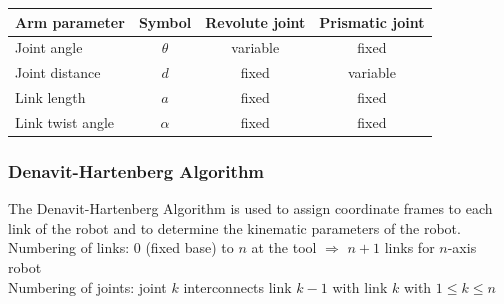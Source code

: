 \documentclass{article}
\begin{document}
	\begin{tabular}{|l|c|c|c|}
		\hline
		\textbf{Arm parameter} & \textbf{Symbol} & \textbf{Revolute joint} & \textbf{Prismatic joint} \\ \hline
		Joint angle            &    $\theta$     &        variable         &          fixed           \\ \hline
		Joint distance         &       $d$       &          fixed          &         variable         \\ \hline
		Link length            &       $a$       &          fixed          &          fixed           \\ \hline
		Link twist angle       &    $\alpha$     &          fixed          &          fixed           \\ \hline
	\end{tabular} 
	
	\subsubsection{Denavit-Hartenberg Algorithm}
	The Denavit-Hartenberg Algorithm is used to assign coordinate frames to each link of the robot and to determine the kinematic parameters of the robot.\\
	Numbering of links: $0$ (fixed base) to $n$ at the tool $\Rightarrow$ $n+1$ links for $n$-axis robot\\
	Numbering of joints: joint $k$ interconnects link $k-1$ with link $k$ with $1 \leq k \leq n$
\end{document}
